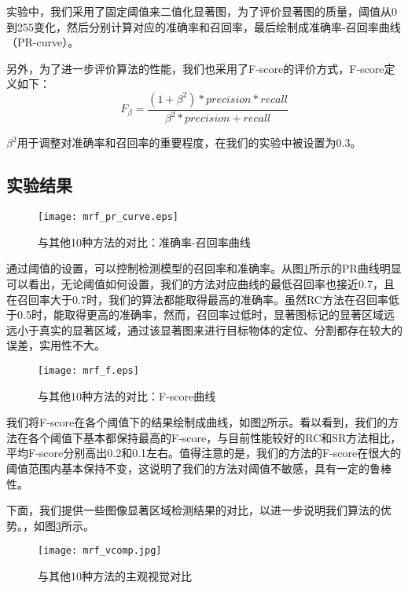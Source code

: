 实验中，我们采用了固定阈值来二值化显著图，为了评价显著图的质量，阈值从0到255变化，然后分别计算对应的准确率和召回率，最后绘制成准确率-召回率曲线（PR-curve）。

另外，为了进一步评价算法的性能，我们也采用了F-score的评价方式，F-score定义如下：
\begin{equation}
F_{\beta} = \frac{(1+\beta^2)*precision*recall}{\beta^2*precision+recall}
\end{equation}

$\beta^2$用于调整对准确率和召回率的重要程度，在我们的实验中被设置为0.3。

\subsection{实验结果}
\begin{figure}
\centering
\texttt{[image: mrf\_pr\_curve.eps]}
\caption{与其他10种方法的对比：准确率-召回率曲线}
\label{fig:results1_pr}
\end{figure}

通过阈值的设置，可以控制检测模型的召回率和准确率。从图\ref{fig:results1_pr}所示的PR曲线明显可以看出，无论阈值如何设置，我们的方法对应曲线的最低召回率也接近0.7，且在召回率大于0.7时，我们的算法都能取得最高的准确率。虽然RC方法在召回率低于0.5时，能取得更高的准确率，然而，召回率过低时，显著图标记的显著区域远远小于真实的显著区域，通过该显著图来进行目标物体的定位、分割都存在较大的误差，实用性不大。

\begin{figure}
\centering
\texttt{[image: mrf\_f.eps]}
\caption{与其他10种方法的对比：F-score曲线}
\label{fig:results1_fscore}
\end{figure}

我们将F-score在各个阈值下的结果绘制成曲线，如图\ref{fig:results1_fscore}所示。看以看到，我们的方法在各个阈值下基本都保持最高的F-score，与目前性能较好的RC和SR方法相比，平均F-score分别高出0.2和0.1左右。值得注意的是，我们的方法的F-score在很大的阈值范围内基本保持不变，这说明了我们的方法对阈值不敏感，具有一定的鲁棒性。

下面，我们提供一些图像显著区域检测结果的对比，以进一步说明我们算法的优势。，如图\ref{fig:vresult1}所示。
\begin{figure}[h]
\centering
\texttt{[image: mrf\_vcomp.jpg]}
\caption{与其他10种方法的主观视觉对比}\label{fig:vresult1}
\end{figure}